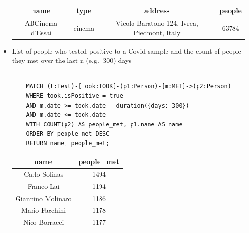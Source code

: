 \documentclass{article}[IEEEtran]
\begin{document}
\begin{itemize}
\begin{lstlisting}
    
    \end{lstlisting}
    
    \vspace{-1.1cm}
    
    \begin{table}[H]
    \hspace{1.48cm}
    \begin{tabular}{|c|c|c|c|}
    \hline
    \textbf{name}    & \textbf{type} & \textbf{address}                            & \textbf{people} \\ \hline
    ABCinema d'Essai & cinema        & Vicolo Baratono 124, Ivrea, Piedmont, Italy & 63784               \\ \hline
    \end{tabular}
    \end{table}
    
    \item List of people who tested positive to a Covid sample and the count of people they met over the last n (e.g.: 300) days
    
    \begin{lstlisting}
    
    MATCH (t:Test)-[took:TOOK]-(p1:Person)-[m:MET]->(p2:Person)
    WHERE took.isPositive = true 
    AND m.date >= took.date - duration({days: 300})  
    AND m.date <= took.date
    WITH COUNT(p2) AS people_met, p1.name AS name
    ORDER BY people_met DESC
    RETURN name, people_met;

    \end{lstlisting}
    
    \vspace{-1cm}
        
        
    \begin{table}[h]
    \hspace{1.48cm}
    \begin{tabular}{|c|c|}
    \hline
    \textbf{name}     & \textbf{people\_met} \\ \hline
    Carlo Solinas     & 1494                 \\ \hline
    Franco Lai        & 1194                 \\ \hline
    Giannino Molinaro & 1186                 \\ \hline
    Mario Facchini    & 1178                 \\ \hline
    Nico Borracci     & 1177                 \\ \hline
    \end{tabular}
    \end{table}
    

\end{itemize}
\end{document}
